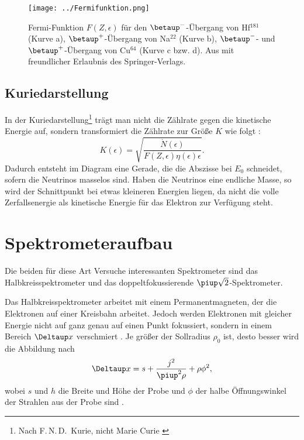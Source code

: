 \documentclass[11pt, ngerman, fleqn, DIV=15, headinclude, BCOR=2cm]{scrreprt}
\begin{document}
\begin{figure}[htbp]
    \centering
    \texttt{[image: ../Fermifunktion.png]}
    \caption{%
        Fermi-Funktion $F(Z, \epsilon)$ für den $\betaminus$-Übergang von
        Hf$^{181}$ (Kurve a), $\betaplus$-Übergang von Na$^{22}$ (Kurve b),
        $\betaminus$- und $\betaplus$-Übergang von Cu$^{64}$ (Kurve c bzw\@.
        d). Aus \parencite[Fig. 111]{Riezler/Kernphysikalisches} mit
        freundlicher Erlaubnis des Springer-Verlags.
    }
    \label{fig:fermifunktion}
\end{figure}

\subsection{Kuriedarstellung}

In der Kuriedarstellung\footnote{Nach F.\,N.\,D\@.~Kurie, nicht Marie Curie
\parencite{wikipedia/Kurie}} trägt man nicht die Zählrate gegen die kinetische
Energie auf, sondern transformiert die Zählrate zur Größe $K$ wie folgt
\parencite[(138)]{Riezler/Kernphysikalisches}:
\[
    K(\epsilon) = \sqrt{\frac{\dot N(\epsilon)}{F(Z, \epsilon) \eta(\epsilon) \epsilon}}.
\]
Dadurch entsteht im Diagram eine Gerade, die die Abszisse bei $E_0$ schneidet,
sofern die Neutrinos masselos sind. Haben die Neutrinos eine endliche Masse, so
wird der Schnittpunkt bei etwas kleineren Energien liegen, da nicht die volle
Zerfallsenergie als kinetische Energie für das Elektron zur Verfügung steht.

\section{Spektrometeraufbau}

Die beiden für diese Art Versuche interessanten Spektrometer sind das
Halbkreisspektrometer und das doppeltfokussierende $\piup \sqrt
2$-Spektrometer.

Das Halbkreisspektrometer arbeitet mit einem Permanentmagneten, der die
Elektronen auf einer Kreisbahn arbeitet. Jedoch werden Elektronen mit gleicher
Energie nicht auf ganz genau auf einen Punkt fokussiert, sondern in einem
Bereich $\Deltaup x$ verschmiert
\parencite[§2.231]{Riezler/Kernphysikalisches}. Je größer der Sollradius
$\rho_0$ ist, desto besser wird die Abbildung nach 
\[
    \Deltaup x = s + \frac{j^2}{\piup^2 \rho} + \rho \phi^2,
\]
wobei $s$ und $h$ die Breite und Höhe der Probe und $\phi$ der halbe
Öffnungswinkel der Strahlen aus der Probe sind
\parencite[(123)]{Riezler/Kernphysikalisches}.
\end{document}
